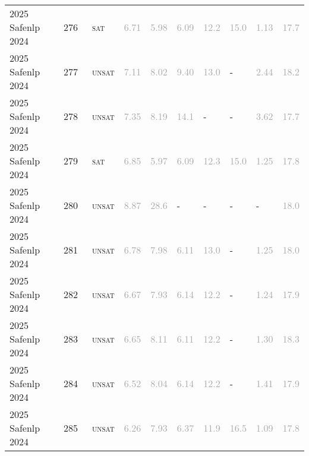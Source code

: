 \begin{center}
{\begin{longtable}{@{}llllllllll@{}}
2025 Safenlp 2024 & 276 & ~\textsc{sat} & \textcolor{darkgray}{6.71} & \textcolor{darkgray}{5.98} & \textcolor{darkgray}{6.09} & \textcolor{darkgray}{12.2} & \textcolor{darkgray}{15.0} & \textcolor{darkgray}{1.13} & \textcolor{darkgray}{17.7} \\
2025 Safenlp 2024 & 277 & ~\textsc{unsat} & \textcolor{darkgray}{7.11} & \textcolor{darkgray}{8.02} & \textcolor{darkgray}{9.40} & \textcolor{darkgray}{13.0} & - & \textcolor{darkgray}{2.44} & \textcolor{darkgray}{18.2} \\
2025 Safenlp 2024 & 278 & ~\textsc{unsat} & \textcolor{darkgray}{7.35} & \textcolor{darkgray}{8.19} & \textcolor{darkgray}{14.1} & - & - & \textcolor{darkgray}{3.62} & \textcolor{darkgray}{17.7} \\
2025 Safenlp 2024 & 279 & ~\textsc{sat} & \textcolor{darkgray}{6.85} & \textcolor{darkgray}{5.97} & \textcolor{darkgray}{6.09} & \textcolor{darkgray}{12.3} & \textcolor{darkgray}{15.0} & \textcolor{darkgray}{1.25} & \textcolor{darkgray}{17.8} \\
2025 Safenlp 2024 & 280 & ~\textsc{unsat} & \textcolor{darkgray}{8.87} & \textcolor{darkgray}{28.6} & - & - & - & - & \textcolor{darkgray}{18.0} \\
2025 Safenlp 2024 & 281 & ~\textsc{unsat} & \textcolor{darkgray}{6.78} & \textcolor{darkgray}{7.98} & \textcolor{darkgray}{6.11} & \textcolor{darkgray}{13.0} & - & \textcolor{darkgray}{1.25} & \textcolor{darkgray}{18.0} \\
2025 Safenlp 2024 & 282 & ~\textsc{unsat} & \textcolor{darkgray}{6.67} & \textcolor{darkgray}{7.93} & \textcolor{darkgray}{6.14} & \textcolor{darkgray}{12.2} & - & \textcolor{darkgray}{1.24} & \textcolor{darkgray}{17.9} \\
2025 Safenlp 2024 & 283 & ~\textsc{unsat} & \textcolor{darkgray}{6.65} & \textcolor{darkgray}{8.11} & \textcolor{darkgray}{6.11} & \textcolor{darkgray}{12.2} & - & \textcolor{darkgray}{1.30} & \textcolor{darkgray}{18.3} \\
2025 Safenlp 2024 & 284 & ~\textsc{unsat} & \textcolor{darkgray}{6.52} & \textcolor{darkgray}{8.04} & \textcolor{darkgray}{6.14} & \textcolor{darkgray}{12.2} & - & \textcolor{darkgray}{1.41} & \textcolor{darkgray}{17.9} \\
2025 Safenlp 2024 & 285 & ~\textsc{unsat} & \textcolor{darkgray}{6.26} & \textcolor{darkgray}{7.93} & \textcolor{darkgray}{6.37} & \textcolor{darkgray}{11.9} & \textcolor{darkgray}{16.5} & \textcolor{darkgray}{1.09} & \textcolor{darkgray}{17.8} \\

\end{longtable}}
\end{center}
